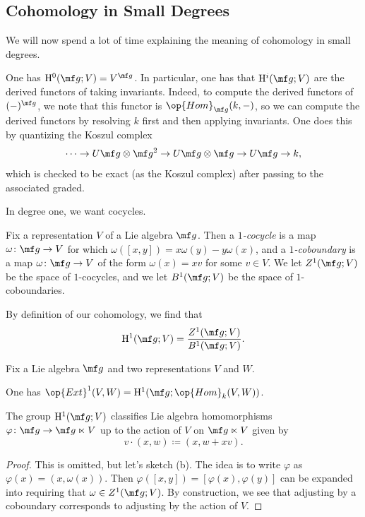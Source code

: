 \documentclass[../notes.tex]{subfiles}
\begin{document}
\subsection{Cohomology in Small Degrees}
We will now spend a lot of time explaining the meaning of cohomology in small degrees.
\begin{example}
	One has $\mathrm H^0(\mf g;V)=V^{\mf g}$. In particular, one has that $\mathrm H^i(\mf g;V)$ are the derived functors of taking invariants. Indeed, to compute the derived functors of $(-)^{\mf g}$, we note that this functor is $\op{Hom}_{\mf g}(k,-)$, so we can compute the derived functors by resolving $k$ first and then applying invariants. One does this by quantizing the Koszul complex
	\[\cdots\to U\mf g\otimes\mf g^2\to U\mf g\otimes\mf g\to U\mf g\to k,\]
	which is checked to be exact (as the Koszul complex) after passing to the associated graded.
\end{example}
In degree one, we want cocycles.
\begin{definition}[cocycle]
	Fix a representation $V$ of a Lie algebra $\mf g$. Then a \textit{$1$-cocycle} is a map $\omega\colon\mf g\to V$ for which $\omega([x,y])=x\omega(y)-y\omega(x)$, and a \textit{$1$-coboundary} is a map $\omega\colon\mf g\to V$ of the form $\omega(x)=xv$ for some $v\in V$. We let $Z^1(\mf g;V)$ be the space of $1$-cocycles, and we let $B^1(\mf g;V)$ be the space of $1$-coboundaries.
\end{definition}
\begin{remark}
	By definition of our cohomology, we find that
	\[\mathrm H^1(\mf g;V)=\frac{Z^1(\mf g;V)}{B^1(\mf g;V)}.\]
\end{remark}
\begin{proposition}
	Fix a Lie algebra $\mf g$ and two representations $V$ and $W$.
	\begin{listalph}
		\item One has $\op{Ext}^1(V,W)=\mathrm H^1(\mf g;\op{Hom}_k(V,W))$.
		\item The group $\mathrm H^1(\mf g;V)$ classifies Lie algebra homomorphisms $\varphi\colon\mf g\to\mf g\ltimes V$ up to the action of $V$ on $\mf g\ltimes V$ given by
		\[v\cdot(x,w)\coloneqq(x,w+xv).\]
	\end{listalph}
\end{proposition}
\begin{proof}
	This is omitted, but let's sketch (b). The idea is to write $\varphi$ as $\varphi(x)=(x,\omega(x))$. Then $\varphi([x,y])=[\varphi(x),\varphi(y)]$ can be expanded into requiring that $\omega\in Z^1(\mf g;V)$. By construction, we see that adjusting by a coboundary corresponds to adjusting by the action of $V$.
\end{proof}
\end{document}
